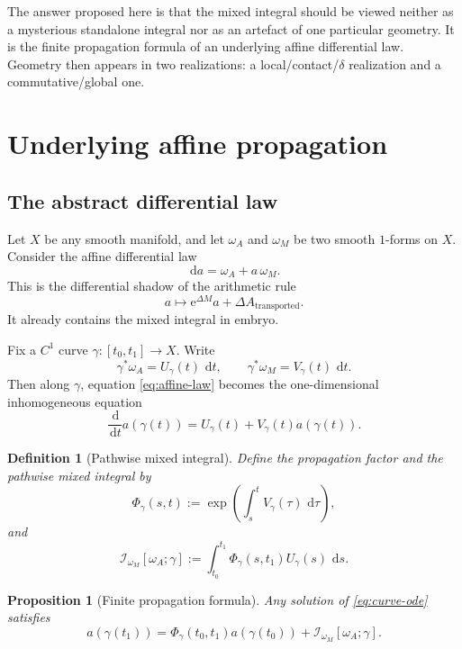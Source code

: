 \documentclass[11pt]{article}
\newtheorem{definition}{Definition}
\newtheorem{proposition}{Proposition}
\newcommand{\dd}{\,\mathrm{d}}
\newcommand{\ee}{\mathrm{e}}
\newcommand{\Ipath}{\mathcal{I}}
\begin{document}
The answer proposed here is that the mixed integral should be viewed neither as a mysterious standalone integral nor as an artefact of one particular geometry. It is the finite propagation formula of an underlying affine differential law. Geometry then appears in two realizations: a local/contact/$\delta$ realization and a commutative/global one.

\section{Underlying affine propagation}

\subsection{The abstract differential law}

Let $X$ be any smooth manifold, and let $\omega_A$ and $\omega_M$ be two smooth $1$-forms on $X$. Consider the affine differential law
\begin{equation}
\label{eq:affine-law}
\dd a=\omega_A+a\,\omega_M.
\end{equation}
This is the differential shadow of the arithmetic rule
\[
a\longmapsto \ee^{\Delta M}a+\Delta A_{\text{transported}}.
\]
It already contains the mixed integral in embryo.

Fix a $C^1$ curve $\gamma:[t_0,t_1]\to X$. Write
\[
\gamma^*\omega_A=U_\gamma(t)\,\dd t,
\qquad
\gamma^*\omega_M=V_\gamma(t)\,\dd t.
\]
Then along $\gamma$, equation \eqref{eq:affine-law} becomes the one-dimensional inhomogeneous equation
\begin{equation}
\label{eq:curve-ode}
\frac{\dd}{\dd t}a(\gamma(t))=U_\gamma(t)+V_\gamma(t)a(\gamma(t)).
\end{equation}

\begin{definition}[Pathwise mixed integral]
Define the propagation factor and the pathwise mixed integral by
\[
\Phi_\gamma(s,t):=\exp\!\left(\int_s^t V_\gamma(\tau)\,\dd\tau\right),
\]
and
\begin{equation}
\label{eq:pathwise-mixed}
\Ipath_{\omega_M}[\omega_A;\gamma]
:=
\int_{t_0}^{t_1}
\Phi_\gamma(s,t_1)U_\gamma(s)\,\dd s.
\end{equation}
\end{definition}

\begin{proposition}[Finite propagation formula]
\label{prop:finite-propagation}
Any solution of \eqref{eq:curve-ode} satisfies
\begin{equation}
\label{eq:finite-propagation}
a(\gamma(t_1))=\Phi_\gamma(t_0,t_1)a(\gamma(t_0))+
\Ipath_{\omega_M}[\omega_A;\gamma].
\end{equation}
\end{proposition}
\end{document}
